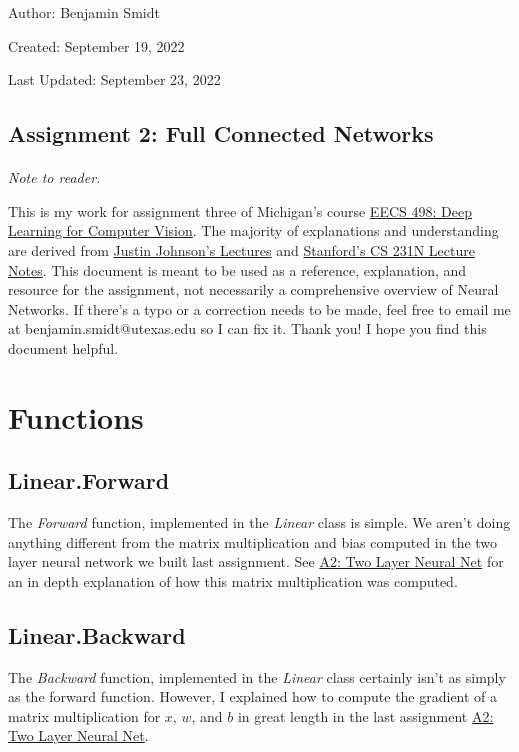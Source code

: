 \documentclass[12pt]{article}
\begin{document}
\noindent Author: Benjamin Smidt

\noindent Created: September 19, 2022

\noindent Last Updated: September 23, 2022
\begin{center}
\section*{Assignment 2: Full Connected Networks}
\end{center}

\paragraph{} \emph{Note to reader.} 

This is my work for assignment three of Michigan's course
\href{https://web.eecs.umich.edu/~justincj/teaching/eecs498/WI2022/}
{EECS 498: Deep Learning for Computer Vision}. The majority of explanations and understanding are 
derived from \href{https://www.youtube.com/watch?v=dJYGatp4SvA&list=PL5-TkQAfAZFbzxjBHtzdVCWE0Zbhomg7r&index=1}
{Justin Johnson's Lectures} and \href{http://cs231n.stanford.edu/schedule.html}{Stanford's CS 231N Lecture Notes}.
This document is meant to be used as a reference, 
explanation, and resource for the assignment, not necessarily a comprehensive overview
of Neural Networks. If there's a typo or a correction needs to be made, feel free to 
email me at benjamin.smidt@utexas.edu so I can fix it. Thank you! I hope you find this 
document helpful.

\newpage
\tableofcontents{}
\newpage

\section{Functions}

\subsection{Linear.Forward}
The \emph{Forward} function, implemented in the \emph{Linear} class is simple. We aren't doing 
anything different from the matrix multiplication and bias computed in the two layer
neural network we built last assignment. See \href{https://github.com/bensmidt/EECS-498-DL-Computer-Vision/blob/main/A2/A2-Two-Layer-NN.pdf}
{A2: Two Layer Neural Net} for an in depth explanation of how this matrix multiplication was 
computed. 

\subsection{Linear.Backward}
The \emph{Backward} function, implemented in the \emph{Linear} class certainly isn't
as simply as the forward function. However, I explained how to compute the gradient of 
a matrix multiplication for $x$, $w$, and $b$ in great length in the last assignment 
\href{https://github.com/bensmidt/EECS-498-DL-Computer-Vision/blob/main/A2/A2-Two-Layer-NN.pdf}
{A2: Two Layer Neural Net}.
\end{document}
